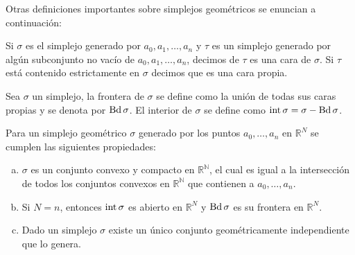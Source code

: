 Otras definiciones importantes sobre simplejos geométricos se enuncian a continuación:
\begin{Defi}
Si $\sigma$ es el simplejo generado por $a_0,a_1,\ldots,a_n$ y $\tau$
es un simplejo generado por algún subconjunto no vacío de $a_0,a_1,\ldots,a_n$, decimos de $\tau$ es una cara de $\sigma$. Si $\tau$ está contenido estrictamente en $\sigma$ decimos que es una cara propia. 
\end{Defi}
\begin{Defi}
Sea $\sigma$ un simplejo, la frontera de $\sigma$ se define como la unión de todas sus caras propias y se denota por $\operatorname{Bd}\sigma$. El interior de $\sigma$ se define como  $\operatorname{int} \sigma = \sigma-\operatorname{Bd}\sigma$. 
\end{Defi}
\begin{Prop}
Para un simplejo geométrico $\sigma$ generado por los puntos $a_0,\ldots,a_n$ en $\mathbb{R}^{N}$ se cumplen las siguientes propiedades:
\begin{enumerate}[(a)]
\item $\sigma$ es un conjunto convexo y compacto en $\mathbb{R^{N}}$, el cual es igual a la intersección de todos los conjuntos convexos en $\mathbb{R^{N}}$ que contienen a $a_0,\ldots,a_n$.
\item Si $N = n$, entonces $\operatorname{int} \sigma$ es abierto en $\mathbb{R}^N$ y $\operatorname{Bd} \sigma$ es su frontera en  $\mathbb{R}^N$.
\item Dado un simplejo $\sigma$ existe un único conjunto geométricamente independiente que lo genera.
\end{enumerate}
\end{Prop}
